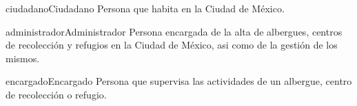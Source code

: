 \begin{actor}{ciudadano}{Ciudadano}{
		Persona que habita en la Ciudad de México.
}	
\end{actor}

\begin{actor}{administrador}{Administrador}{
		Persona encargada de la alta de albergues, centros de recolección y refugios en la Ciudad de México, asi como de la gestión de los mismos.
}	
\end{actor}

\begin{actor}{encargado}{Encargado}{
		Persona que supervisa las actividades de un albergue, centro de recolección o refugio.
}	
\end{actor}

